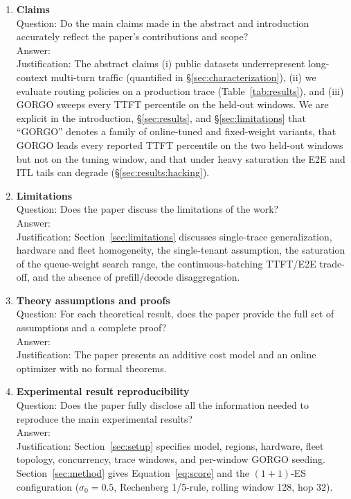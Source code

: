 \documentclass{article}
\begin{document}
\begin{enumerate}

\item {\bf Claims}\\
Question: Do the main claims made in the abstract and introduction accurately reflect the paper's contributions and scope?\\
Answer: \answerYes{}\\
Justification: The abstract claims (i) public datasets underrepresent long-context multi-turn traffic (quantified in \S\ref{sec:characterization}), (ii) we evaluate routing policies on a production trace (Table~\ref{tab:results}), and (iii) GORGO sweeps every TTFT percentile on the held-out windows. We are explicit in the introduction, \S\ref{sec:results}, and \S\ref{sec:limitations} that ``GORGO'' denotes a family of online-tuned and fixed-weight variants, that GORGO leads every reported TTFT percentile on the two held-out windows but not on the tuning window, and that under heavy saturation the E2E and ITL tails can degrade (\S\ref{sec:results:hacking}).

\item {\bf Limitations}\\
Question: Does the paper discuss the limitations of the work?\\
Answer: \answerYes{}\\
Justification: Section~\ref{sec:limitations} discusses single-trace generalization, hardware and fleet homogeneity, the single-tenant assumption, the saturation of the queue-weight search range, the continuous-batching TTFT/E2E trade-off, and the absence of prefill/decode disaggregation.

\item {\bf Theory assumptions and proofs}\\
Question: For each theoretical result, does the paper provide the full set of assumptions and a complete proof?\\
Answer: \answerNA{}\\
Justification: The paper presents an additive cost model and an online optimizer with no formal theorems.

\item {\bf Experimental result reproducibility}\\
Question: Does the paper fully disclose all the information needed to reproduce the main experimental results?\\
Answer: \answerYes{}\\
Justification: Section~\ref{sec:setup} specifies model, regions, hardware, fleet topology, concurrency, trace windows, and per-window GORGO seeding. Section~\ref{sec:method} gives Equation~\ref{eq:score} and the $(1{+}1)$-ES configuration ($\sigma_0=0.5$, Rechenberg 1/5-rule, rolling window 128, hop 32).


\end{enumerate}
\end{document}
